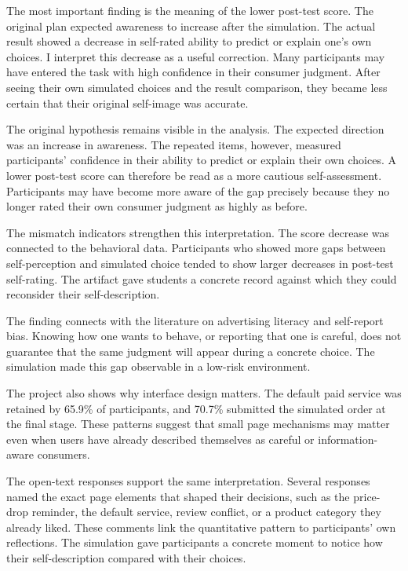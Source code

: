\documentclass[stu,12pt,floatsintext]{apa7}
\begin{document}
The most important finding is the meaning of the lower post-test score. The original plan expected awareness to increase after the simulation. The actual result showed a decrease in self-rated ability to predict or explain one's own choices. I interpret this decrease as a useful correction. Many participants may have entered the task with high confidence in their consumer judgment. After seeing their own simulated choices and the result comparison, they became less certain that their original self-image was accurate.

The original hypothesis remains visible in the analysis. The expected direction was an increase in awareness. The repeated items, however, measured participants' confidence in their ability to predict or explain their own choices. A lower post-test score can therefore be read as a more cautious self-assessment. Participants may have become more aware of the gap precisely because they no longer rated their own consumer judgment as highly as before.

The mismatch indicators strengthen this interpretation. The score decrease was connected to the behavioral data. Participants who showed more gaps between self-perception and simulated choice tended to show larger decreases in post-test self-rating. The artifact gave students a concrete record against which they could reconsider their self-description.

The finding connects with the literature on advertising literacy and self-report bias. Knowing how one wants to behave, or reporting that one is careful, does not guarantee that the same judgment will appear during a concrete choice. The simulation made this gap observable in a low-risk environment.

The project also shows why interface design matters. The default paid service was retained by 65.9\% of participants, and 70.7\% submitted the simulated order at the final stage. These patterns suggest that small page mechanisms may matter even when users have already described themselves as careful or information-aware consumers.

The open-text responses support the same interpretation. Several responses named the exact page elements that shaped their decisions, such as the price-drop reminder, the default service, review conflict, or a product category they already liked. These comments link the quantitative pattern to participants' own reflections. The simulation gave participants a concrete moment to notice how their self-description compared with their choices.
\end{document}
